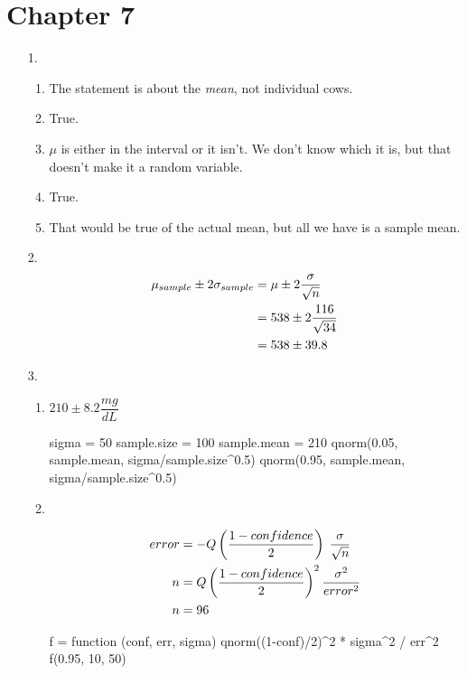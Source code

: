 \documentclass{article}
\begin{document}
\section*{Chapter 7}
\begin{enumerate}


\item[1.]
\begin{enumerate}
\item The statement is about the {\it mean}, not individual cows.
\item True.
\item $\mu$ is either in the interval or it isn't. We don't know which it is, but that doesn't make it a random variable.
\item True.
\item That would be true of the actual mean, but all we have is a sample mean.
\end{enumerate}


\item[2.]
\begin{align}
	\mu_{sample} \pm 2 \sigma_{sample}
	&= \mu \pm 2 \dfrac{\sigma}{\sqrt{n}} \notag\\
	&= 538 \pm 2 \dfrac{116}{\sqrt{34}} \notag\\
	&= 538 \pm 39.8 \notag
\end{align}


\newpage
\item[3.]
\begin{enumerate}
\item
\begin{minipage}{0.3\textwidth}
$210 \pm 8.2 \dfrac{mg}{dL}$
\end{minipage}
\begin{minipage}{0.6\textwidth}
\begin{code}
sigma = 50
sample.size = 100
sample.mean = 210
qnorm(0.05, sample.mean, sigma/sample.size^0.5)
qnorm(0.95, sample.mean, sigma/sample.size^0.5)
\end{code}
\end{minipage}

\item
\hspace{0em}\\
\begin{minipage}{0.4\textwidth}
\begin{align}
	error &= -Q\left(\dfrac{1-confidence}{2}\right) \; \dfrac{\sigma}{\sqrt{n}} \notag\\
	n &= Q\left(\dfrac{1-confidence}{2}\right)^2 \dfrac{\sigma^2}{error^2} \notag\\
	n &= 96 \notag
\end{align}
\end{minipage}
\begin{minipage}{0.5\textwidth}
\begin{code}
f = function (conf, err, sigma) {
  qnorm((1-conf)/2)^2 * sigma^2 / err^2
}
f(0.95, 10, 50)
\end{code}
\end{minipage}


\end{enumerate}
\end{enumerate}
\end{document}
